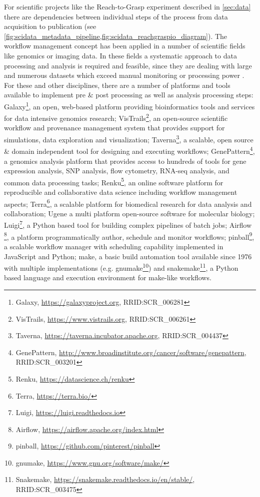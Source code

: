 For scientific projects like the Reach-to-Grasp experiment described in \cref{sec:data} there are dependencies between individual steps of the process from data acquisition to publication (see \cref{fig:scidata_metadata_pipeline,fig:scidata_reachgraspio_diagram}). The workflow management concept has been applied in a number of scientific fields like genomics or imaging data. In these fields a systematic approach to data processing and analysis is required and feasible, since they are dealing with large and numerous datasets which exceed manual monitoring or processing power \citep[e.g.][]{Palm_2010}.
For these and other disciplines, there are a number of platforms and tools available to implement pre \& post processing as well as analysis processing steps: Galaxy\footnote{Galaxy, \url{https://galaxyproject.org}, RRID:SCR\_006281}, an  open, web-based platform providing bioinformatics tools and services for data intensive genomics research; VisTrails\footnote{VisTrails, \url{https://www.vistrails.org}, RRID:SCR\_006261}, an open-source scientific workflow and provenance management system that provides support for simulations, data exploration and visualization; Taverna\footnote{Taverna, \url{https://taverna.incubator.apache.org}, RRID:SCR\_004437}, a scalable, open source \& domain independent tool for designing and executing workflows;  GenePattern\footnote{GenePattern, \url{http://www.broadinstitute.org/cancer/software/genepattern}, RRID:SCR\_003201}, a genomics analysis platform that provides access to hundreds of tools for gene expression analysis, SNP analysis, flow cytometry, RNA-seq analysis, and common data processing tasks; Renku\footnote{Renku, \url{https://datascience.ch/renku}}, an online software platform for reproducible and collaborative data science including workflow management aspects; Terra\footnote{Terra, \url{https://terra.bio/}}, a scalable platform  for biomedical research for data analysis and collaboration; Ugene \citep{Okonechnikov_2012} a multi platform open-source software for molecular biology; Luigi\footnote{Luigi, \url{https://luigi.readthedocs.io}}, a Python based tool for building complex pipelines of batch jobs; Airflow \footnote{Airflow, \url{https://airflow.apache.org/index.html}}, a platform programmatically author, schedule and monitor workflows; pinball\footnote{pinball, \url{https://github.com/pinterest/pinball}}, a scalable workflow manager with scheduling capability implemented in JavaScript and Python; make, a basic build automation tool available since 1976 with multiple implementations (e.g. gnumake\footnote{gnumake, \url{https://www.gnu.org/software/make/}}) and snakemake\footnote{Snakemake, \url{https://snakemake.readthedocs.io/en/stable/}, RRID:SCR\_003475}, a Python based language and execution environment for make-like workflows. 

